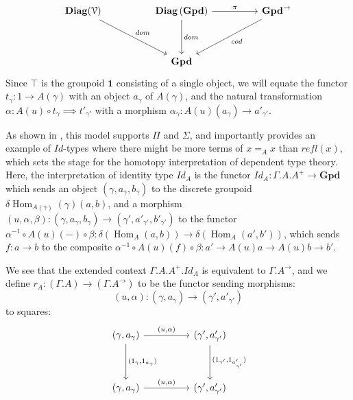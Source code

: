 \documentclass[a4paper,english]{lipics-v2018}
\DeclareMathOperator{\diag}{\mathbf{Diag}}
\DeclareMathOperator{\Hom}{\text{Hom}}
\begin{document}
\[
\begin{tikzcd}[row sep=huge, column sep=huge]
\diag(\mathcal{V}) \ar[rd, "dom"]  & \diag{\mathbf{(Gpd)}} \ar[d, "dom"] \ar[r, "\pi"] & \mathbf{Gpd}^\to \ar[ld, "cod"] \\
& \mathbf{Gpd}
\end{tikzcd}
\]
Since $\top$ is the groupoid $\mathbf{1}$ consisting of a single object, we will equate the functor $t_\gamma : 1 \to A(\gamma)$ with an object $a_\gamma$ of $A(\gamma)$, and the natural transformation $\alpha : A(u) \circ t_\gamma \implies t'_{\gamma'}$ with a morphism $\alpha_\gamma : A(u)(a_\gamma) \to a'_{\gamma'}$.

As shown in \cite{hofmann1998}, this model supports $\Pi$ and $\Sigma$, and importantly provides an example of $Id$-types where there might be more terms of $x =_A x$ than $refl(x)$, which sets the stage for the homotopy interpretation of dependent type theory. Here, the interpretation of identity type $Id_A$ is the functor $Id_A : \Gamma.A.A^+ \to \mathbf{Gpd}$ which sends an object $(\gamma, a_\gamma, b_\gamma)$ to the discrete groupoid $\delta \Hom_{A(\gamma)}(\gamma)(a,b)$, and a morphism $(u, \alpha, \beta) : (\gamma, a_{\gamma}, b_\gamma) \to (\gamma', a'_{\gamma'}, b'_{\gamma'})$ to the functor $\alpha^{-1} \circ A(u)(-) \circ \beta : \delta(\Hom_A(a, b)) \to \delta(\Hom_A(a',b'))$, which sends $f : a \to b$ to the composite $\alpha^{-1}\circ A(u)(f) \circ \beta : a' \to A(u)a \to A(u)b \to b'$.

We see that the extended context $\Gamma.A.A^+.Id_A$ is equivalent to $\Gamma.A^\to$, and we define $r_A : (\Gamma.A) \to (\Gamma.A^\to)$ to be the functor sending morphisms:
\[
  (u, \alpha) : (\gamma, a_\gamma) \to (\gamma', a'_{\gamma'})
\]
to squares:
\[
  \begin{tikzcd}[row sep=huge, column sep=huge]
  (\gamma, a_\gamma) \ar[r, "{(u, \alpha)}"] \ar[d, "{(1_{\gamma}, 1_{a_\gamma})}"] &   (\gamma', a'_{\gamma'}) \ar[d, "{(1_{\gamma'}, 1_{a'_{\gamma'}})}"]\\
    (\gamma, a_\gamma) \ar[r, "{(u, \alpha)}"] & (\gamma', a'_{\gamma'})
  \end{tikzcd}
\]
\end{document}
